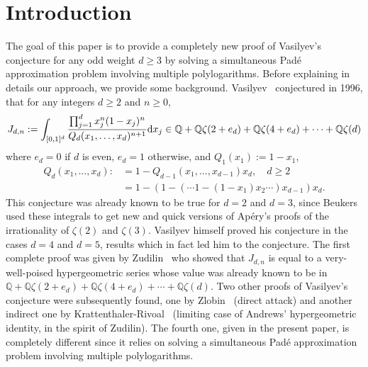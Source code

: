 \documentclass[reqno,12pt]{amsart}
\numberwithin{equation}{section}
\theoremstyle{remark}
\def\dd{\textup{d}}
\begin{document}
\section{Introduction}
The goal 
of this paper is to provide a completely new proof of Vasilyev's conjecture for any odd weight $d\ge 3$ 
by solving a simultaneous Pad\'e approximation problem involving multiple polylogarithms.  Before explaining in details 
our approach, we provide some background. Vasilyev~\cite{vasiliev} conjectured in 1996, 
that for any integers $d\ge 2$ and $n\ge 0$, 
\begin{equation}\label{eq:intro1}
J_{d,n}:=\int_{[0,1]^d} \frac{\prod_{j=1}^d x_j^n(1-x_j)^n}{Q_d(x_1,  \ldots, x_d)^{n+1}} \dd x_j \in \mathbb Q + 
\mathbb Q \zeta(2+e_d) + \mathbb Q \zeta(4+e_d) + \cdots +  \mathbb Q \zeta(d)
\end{equation}
where $e_d=0$ if $d$ is even, $e_d=1$ otherwise, and $Q_1(x_1):=1-x_1$,
\begin{align*}
Q_d(x_1, \ldots, x_d):&=1-Q_{d-1}(x_1, \ldots, x_{d-1})x_d, \quad d\ge 2
\\                   &=1-(1-(\cdots 1-(1-x_1)x_2\cdots )x_{d-1})x_d.
\end{align*}
This conjecture was already known to be true for $d=2$ and $d=3$, since Beukers~\cite{beukers} used these integrals to 
get new and quick versions of Ap\'ery's proofs \cite{Apery} of the irrationality of $\zeta(2)$ and $\zeta(3)$. 
Vasilyev himself proved his conjecture in 
the cases $d=4$ and $d=5$, results which in fact led him to the conjecture. The first complete proof 
was given by Zudilin~\cite{zudilin} who showed that $J_{d,n}$ is   equal to a very-well-poised hypergeometric series 
whose value was already known to be  in $\mathbb Q + \mathbb Q \zeta(2+e_d) + \mathbb Q \zeta(4+e_d) + \cdots 
+  \mathbb Q \zeta(d)$. Two other proofs of Vasilyev's conjecture  were subsequently found, 
one by Zlobin~\cite{zlobin} (direct attack) and another indirect one by 
Krattenthaler-Rivoal~\cite{kratriv} (limiting case of Andrews' hypergeometric identity, in the spirit of Zudilin). The 
fourth one, given in the present paper, is completely different since it relies on solving a 
simultaneous Pad\'e approximation problem involving multiple polylogarithms.  

\bigskip
\end{document}
